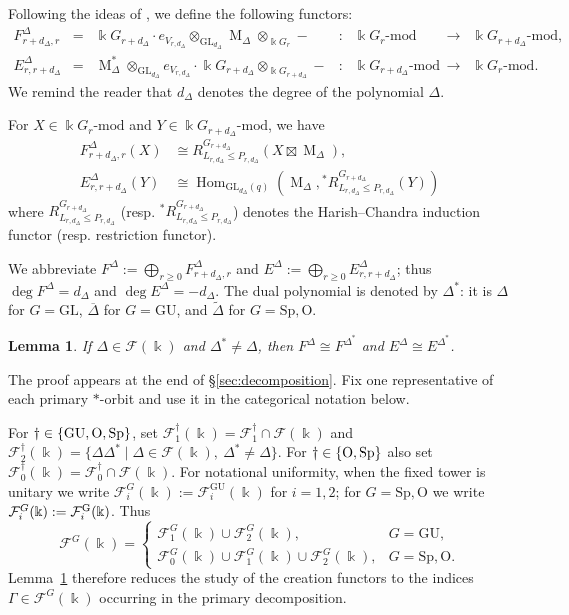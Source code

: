 \documentclass[12pt]{amsart}
\numberwithin{itemcounter}{subsection}
\theoremstyle{plain}
\newtheorem{lemma}[theorem]{Lemma}
\theoremstyle{definition}
\theoremstyle{remark}
\numberwithin{equation}{section}
\def\k{\Bbbk}
\def\O{\mathrm{O}}
\def\Sp{\mathrm{Sp}}
\def\GL{\mathrm{GL}}
\def\GU{\mathrm{GU}}
\def\M{{\operatorname{M}\nolimits}}
\def\Hom{\operatorname{Hom}\nolimits}
\def\Hom{\operatorname{Hom}}
\DeclareMathOperator*{\ot}{\otimes}
\begin{document}
Following the ideas of \cite{CR08,DVV17,DVV19,LLZ}, we define the following functors:
\[
\begin{array}{rcrclcl}
F^\Delta_{r+d_\Delta,r} &=& \k G_{r+d_\Delta} \cdot e_{V_{r,d_\Delta}} \ot_{\GL_{d_\Delta}} \M_\Delta \ot_{\k G_r} - &:& \k G_r\text{-mod} &\to& \k G_{r+d_\Delta}\text{-mod}, \\
E^\Delta_{r,r+d_\Delta} &=& \M_\Delta^* \ot_{\GL_{d_\Delta}} e_{V_{r,d_\Delta}}\cdot \k G_{r+d_\Delta} \ot_{\k G_{r+d_\Delta}} - &:& \k G_{r+d_\Delta}\text{-mod} &\to& \k G_r\text{-mod}.
\end{array}
\]
We remind the reader that $d_\Delta$ denotes the degree of the polynomial $\Delta.$

For \(X \in \k G_r\text{-mod}\) and \(Y \in \k G_{r+d_\Delta}\text{-mod}\), we have
\begin{align*}
F^\Delta_{r+d_\Delta,r}(X) &\cong R_{L_{r,d_\Delta} \leq P_{r,d_\Delta}}^{G_{r+d_\Delta}} (X \boxtimes \M_\Delta), \\
E^\Delta_{r,r+d_\Delta}(Y) &\cong \Hom_{\GL_{d_\Delta}(q)} \left( \M_\Delta, {^*R}_{L_{r,d_\Delta} \leq P_{r,d_\Delta}}^{G_{r+d_\Delta}} (Y) \right)
\end{align*}
where \(R_{L_{r,d_\Delta} \leq P_{r,d_\Delta}}^{G_{r+d_\Delta}}\) (resp. \({^*R}_{L_{r,d_\Delta} \leq P_{r,d_\Delta}}^{G_{r+d_\Delta}}\)) denotes the Harish--Chandra induction functor (resp. restriction functor).

We abbreviate
\(F^\Delta:=\bigoplus_{r\ge0}F^\Delta_{r+d_\Delta,r}\) and
\(E^\Delta:=\bigoplus_{r\ge0}E^\Delta_{r,r+d_\Delta}\); thus
\(\deg F^\Delta=d_\Delta\) and \(\deg E^\Delta=-d_\Delta\).
The dual polynomial is denoted by \(\Delta^*\): it is \(\Delta\) for
\(G=\GL\), \(\overline\Delta\) for \(G=\GU\), and \(\widetilde\Delta\)
for \(G=\Sp,\O\).

\begin{lemma}\label{Lem:isomfunctors}
If \(\Delta\in\mathcal F(\k)\) and \(\Delta^*\ne\Delta\), then
\(F^\Delta\cong F^{\Delta^*}\) and \(E^\Delta\cong E^{\Delta^*}\).
\end{lemma}
The proof appears at the end of \S\ref{sec:decomposition}.  Fix one
representative of each primary \(*\)-orbit and use it in the categorical
notation below.

For \(\dagger\in\{\GU,\rm O,\Sp\}\), set
\(\mathcal F_1^\dagger(\k)=\mathcal F_1^\dagger\cap\mathcal F(\k)\) and
\(\mathcal F_2^\dagger(\k)=\{\Delta\Delta^*\mid
\Delta\in\mathcal F(\k),\ \Delta^*\ne\Delta\}\).  For
\(\dagger\in\{\rm O,\Sp\}\) also set
\(\mathcal F_0^\dagger(\k)=\mathcal F_0^\dagger\cap\mathcal F(\k)\).
For notational uniformity, when the fixed tower is unitary we write
\(\mathcal F_i^G(\k):=\mathcal F_i^{\GU}(\k)\) for \(i=1,2\); for
\(G=\Sp,\O\) we write \(\mathcal F_i^G(\k):=\mathcal F_i^{\rm G}(\k)\).
Thus
\[
 \mathcal F^G(\k)=
 \begin{cases}
  \mathcal F_1^G(\k)\cup\mathcal F_2^G(\k),&G=\GU,\\
  \mathcal F_0^G(\k)\cup\mathcal F_1^G(\k)\cup\mathcal F_2^G(\k),&G=\Sp,\O.
 \end{cases}
\]
Lemma~\ref{Lem:isomfunctors} therefore reduces the study of the creation
functors to the indices \(\Gamma\in\mathcal F^G(\k)\) occurring in the primary decomposition.
\end{document}
